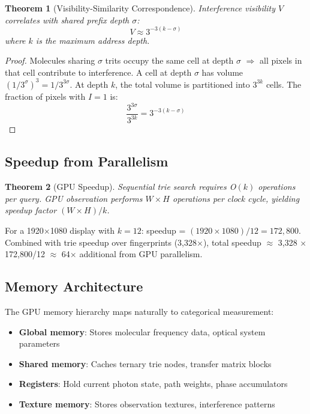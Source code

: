 \documentclass[11pt,a4paper]{article}
\newtheorem{theorem}{Theorem}[section]
\theoremstyle{definition}
\theoremstyle{remark}
\begin{document}
\begin{theorem}[Visibility-Similarity Correspondence]
\label{thm:visibility_similarity}
Interference visibility $V$ correlates with shared prefix depth $\sigma$:
\begin{equation}
V \approx 3^{-3(k-\sigma)}
\end{equation}
where $k$ is the maximum address depth.
\end{theorem}

\begin{proof}
Molecules sharing $\sigma$ trits occupy the same cell at depth $\sigma$ $\Rightarrow$ all pixels in that cell contribute to interference. A cell at depth $\sigma$ has volume $(1/3^\sigma)^3 = 1/3^{3\sigma}$. At depth $k$, the total volume is partitioned into $3^{3k}$ cells. The fraction of pixels with $I=1$ is:
\begin{equation}
\frac{3^{3\sigma}}{3^{3k}} = 3^{-3(k-\sigma)}
\end{equation}
\end{proof}

\subsection{Speedup from Parallelism}

\begin{theorem}[GPU Speedup]
\label{thm:gpu_speedup}
Sequential trie search requires O$(k)$ operations per query. GPU observation performs $W \times H$ operations per clock cycle, yielding speedup factor $(W \times H)/k$.
\end{theorem}

For a 1920$\times$1080 display with $k=12$: speedup = $(1920 \times 1080)/12 = 172{,}800$. Combined with trie speedup over fingerprints (3,328$\times$), total speedup $\approx$ 3,328 $\times$ 172,800/12 $\approx$ 64$\times$ additional from GPU parallelism.

\subsection{Memory Architecture}

The GPU memory hierarchy maps naturally to categorical measurement:
\begin{itemize}
\item \textbf{Global memory}: Stores molecular frequency data, optical system parameters
\item \textbf{Shared memory}: Caches ternary trie nodes, transfer matrix blocks
\item \textbf{Registers}: Hold current photon state, path weights, phase accumulators
\item \textbf{Texture memory}: Stores observation textures, interference patterns
\end{itemize}
\end{document}
